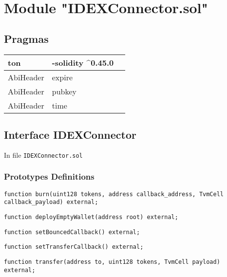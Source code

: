 
\section{Module "IDEXConnector.sol"}


\subsection{Pragmas}


\noindent\begin{tabular}{|l|l|p{5cm}|}\hline
ton & -solidity \^{}0.45.0 &\\\hline
AbiHeader &  expire &\\\hline
AbiHeader &  pubkey &\\\hline
AbiHeader &  time &\\\hline
\end{tabular}


\subsection{Interface IDEXConnector}


In file {\tt IDEXConnector.sol}

\subsubsection{Prototypes Definitions}

\vspace{2cm}

\begin{lstlisting}[firstnumber=11]
  function burn(uint128 tokens, address callback_address, TvmCell callback_payload) external;
\end{lstlisting}
\vspace{2cm}

\begin{lstlisting}[firstnumber=7]
  function deployEmptyWallet(address root) external;
\end{lstlisting}
\vspace{2cm}

\begin{lstlisting}[firstnumber=9]
  function setBouncedCallback() external;
\end{lstlisting}
\vspace{2cm}

\begin{lstlisting}[firstnumber=8]
  function setTransferCallback() external;
\end{lstlisting}
\vspace{2cm}

\begin{lstlisting}[firstnumber=10]
  function transfer(address to, uint128 tokens, TvmCell payload) external;
\end{lstlisting}
